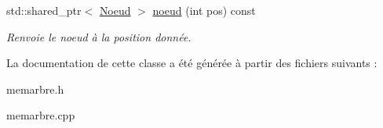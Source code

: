\begin{DoxyCompactItemize}
\item 
std\+::shared\+\_\+ptr$<$ \hyperlink{classMemArbre_1_1Noeud}{Noeud} $>$ \hyperlink{classMemArbre_a474515fbd83097859ff121dd0cc4a57c}{noeud} (int pos) const \hypertarget{classMemArbre_a474515fbd83097859ff121dd0cc4a57c}{}\label{classMemArbre_a474515fbd83097859ff121dd0cc4a57c}

\begin{DoxyCompactList}\small\item\em Renvoie le noeud à la position donnée. \end{DoxyCompactList}\end{DoxyCompactItemize}


La documentation de cette classe a été générée à partir des fichiers suivants \+:\begin{DoxyCompactItemize}
\item 
memarbre.\+h\item 
memarbre.\+cpp\end{DoxyCompactItemize}
